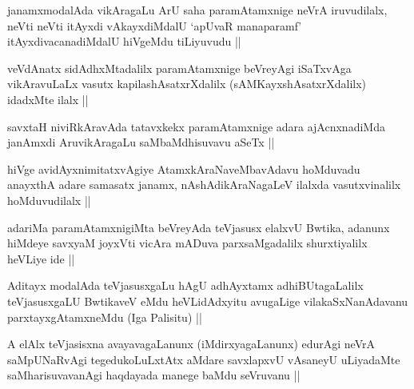 \begin{artha}
janamxmodalAda vikAragaLu ArU saha paramAtamxnige neVrA iruvudilalx,
neVti neVti itAyxdi vAkayxdiMdalU `apUvaR manaparamf'
itAyxdivacanadiMdalU hiVgeMdu tiLiyuvudu ||
\end{artha}


\begin{artha}
veVdAnatx sidAdhxMtadalilx paramAtamxnige beVreyAgi iSaTxvAga
vikAravuLaLx vasutx kapilashAsatxrXdalilx (sAMKayxshAsatxrXdalilx)
idadxMte ilalx ||
\end{artha}


\begin{artha}
savxtaH niviRkAravAda tatavxkekx paramAtamxnige adara ajAcnxnadiMda
janAmxdi AruvikAragaLu saMbaMdhisuvavu aSeTx ||
\end{artha}

\begin{artha}
hiVge avidAyxnimitatxvAgiye AtamxkAraNaveMbavAdavu hoMduvadu anayxthA
adare samasatx janamx, nAshAdikAraNagaLeV ilalxda vasutxvinalilx
hoMduvudilalx ||
\end{artha}


\begin{artha}
adariMa paramAtamxnigiMta beVreyAda teVjasusx elalxvU Bwtika, adanunx
hiMdeye savxyaM joyxVti vicAra mADuva parxsaMgadalilx shurxtiyalilx
heVLiye ide ||
\end{artha}

\begin{artha}
Aditayx modalAda teVjasusxgaLu hAgU adhAyxtamx adhiBUtagaLalilx
teVjasusxgaLU BwtikaveV eMdu heVLidAdxyitu avugaLige
vilakaSxNanAdavanu parxtayxgAtamxneMdu (Iga Palisitu) ||
\end{artha}

\begin{artha}
A elAlx teVjasisxna avayavagaLanunx (iMdirxyagaLanunx) edurAgi neVrA
saMpUNaRvAgi tegedukoLuLxtAtx aMdare savxlapxvU vAsaneyU uLiyadaMte
saMharisuvavanAgi haqdayada manege baMdu seVruvanu ||
\end{artha}


